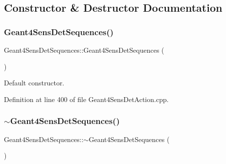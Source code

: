 \subsection{Constructor \& Destructor Documentation}
\hypertarget{class_d_d4hep_1_1_simulation_1_1_geant4_sens_det_sequences_a5a78304dcb1472bf7a7de1b4305a264f}{}\label{class_d_d4hep_1_1_simulation_1_1_geant4_sens_det_sequences_a5a78304dcb1472bf7a7de1b4305a264f} 
\subsubsection{\texorpdfstring{Geant4\+Sens\+Det\+Sequences()}{Geant4SensDetSequences()}}
{\footnotesize\ttfamily Geant4\+Sens\+Det\+Sequences\+::\+Geant4\+Sens\+Det\+Sequences (\begin{DoxyParamCaption}{ }\end{DoxyParamCaption})}



Default constructor. 



Definition at line 400 of file Geant4\+Sens\+Det\+Action.\+cpp.

\hypertarget{class_d_d4hep_1_1_simulation_1_1_geant4_sens_det_sequences_a6f27557827175da8f038b84959cb109d}{}\label{class_d_d4hep_1_1_simulation_1_1_geant4_sens_det_sequences_a6f27557827175da8f038b84959cb109d} 
\subsubsection{\texorpdfstring{$\sim$\+Geant4\+Sens\+Det\+Sequences()}{~Geant4SensDetSequences()}}
{\footnotesize\ttfamily Geant4\+Sens\+Det\+Sequences\+::$\sim$\+Geant4\+Sens\+Det\+Sequences (\begin{DoxyParamCaption}{ }\end{DoxyParamCaption})\hspace{0.3cm}{\ttfamily [virtual]}}



